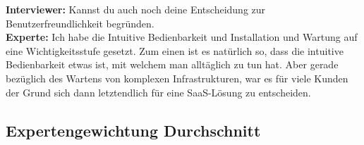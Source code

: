 \begin{linenumbers}
    \textbf{Interviewer:} Kannst du auch noch deine Entscheidung zur Benutzerfreundlichkeit begründen.\\
    \textbf{Experte:} Ich habe die Intuitive Bedienbarkeit und Installation und Wartung auf eine Wichtigkeitsstufe gesetzt. Zum einen ist es natürlich so, dass die intuitive Bedienbarkeit etwas ist, mit welchem man alltäglich zu tun hat. Aber gerade bezüglich des Wartens von komplexen Infrastrukturen, war es für viele Kunden der Grund sich dann letztendlich für eine SaaS-Lösung zu entscheiden.\\
\end{linenumbers}



\newpage
\subsection{Expertengewichtung Durchschnitt}
\begin{center}
\begin{figure}[H]
    \centering
    \label{fig:CEA}
\end{figure}	
\end{center}
\begin{center}
\begin{figure}[H]
    \centering
    \label{fig:CEA}
\end{figure}	
\end{center}

\begin{center}
\begin{figure}[H]
    \centering
    \label{fig:CEA}
\end{figure}	
\end{center}